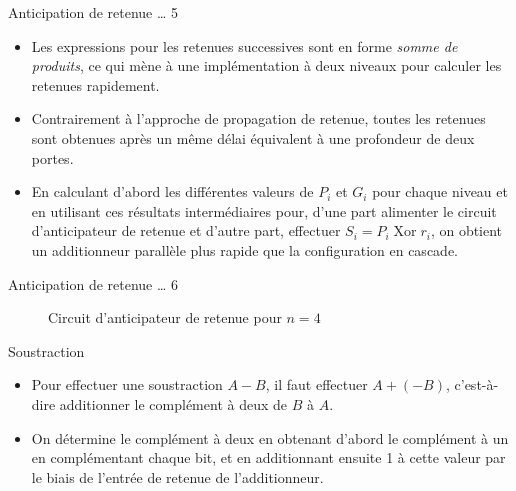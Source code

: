 \documentclass[presentation]{beamer}
\begin{document}
\begin{frame}[label={sec:org42a7ccc}]{Anticipation de retenue \ldots{} 5}
\begin{itemize}
\item Les expressions pour les retenues successives sont en forme \emph{somme de produits}, ce qui mène à une implémentation à deux niveaux pour calculer les retenues rapidement.

\item Contrairement à l'approche de propagation de retenue, toutes les retenues sont obtenues après un même délai équivalent à une profondeur de deux portes.

\item En calculant d'abord les différentes valeurs de \(P_i\) et \(G_i\) pour chaque niveau et en utilisant ces résultats intermédiaires pour, d'une part alimenter le circuit d'anticipateur de retenue et d'autre part, effectuer \(S_i = P_i \operatorname{Xor} r_i\), on obtient un additionneur parallèle plus rapide que la configuration en cascade.
\end{itemize}
\end{frame}

\begin{frame}[label={sec:orgcf2039d}]{Anticipation de retenue \ldots{} 6}
\begin{figure}[htbp]
\centering

\caption{\label{fig:orga67bd5d}Circuit d'anticipateur de retenue pour \(n= 4\)}
\end{figure}
\end{frame}


\begin{frame}[label={sec:org7e1490e}]{Soustraction}
\begin{itemize}
\item Pour effectuer une soustraction \(A - B\), il faut effectuer \(A + (-B)\), c’est-à-dire additionner le complément à deux de \(B\) à \(A\).

\item On détermine le complément à deux en obtenant d'abord le complément à un en complémentant chaque bit, et en additionnant ensuite 1 à cette valeur par le biais de l'entrée de retenue de l'additionneur.
\end{itemize}
\end{frame}
\end{document}
